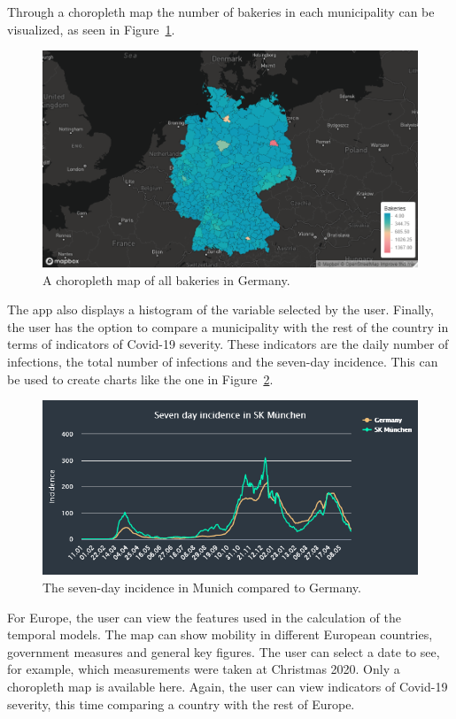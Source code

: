 Through a choropleth map the number of bakeries in each municipality can be visualized, as seen in Figure~\ref{fig:map_3}.
\begin{figure}[H]
    \centering
    \includegraphics[width = \textwidth]{bakeries_germany_choro.png}
    \caption{A choropleth map of all bakeries in Germany.}
    \label{fig:map_3}
\end{figure}
The app also displays a histogram of the variable selected by the user. Finally, the user has the option to compare a municipality with the rest of the country in terms of indicators of Covid-19 severity. These indicators are the daily number of infections, the total number of infections and the seven-day incidence. This can be used to create charts like the one in Figure~\ref{fig:inc_muc}.
\begin{figure}[H]
    \centering
    \includegraphics[width = \textwidth]{inc_muc.png}
    \caption{The seven-day incidence in Munich compared to Germany.}
    \label{fig:inc_muc}
\end{figure}
For Europe, the user can view the features used in the calculation of the temporal models. The map can show mobility in different European countries, government measures and general key figures. The user can select a date to see, for example, which measurements were taken at Christmas 2020. Only a choropleth map is available here. Again, the user can view indicators of Covid-19 severity, this time comparing a country with the rest of Europe.
